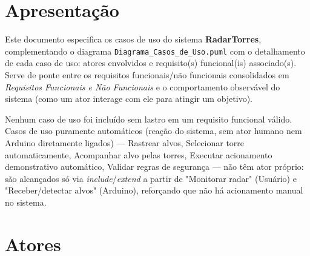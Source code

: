 %

\section{Apresentação}

Este documento especifica os casos de uso do sistema \textbf{RadarTorres}, complementando o
diagrama \texttt{Diagrama\_Casos\_de\_Uso.puml} com o detalhamento de cada caso de uso: atores
envolvidos e requisito(s) funcional(is) associado(s). Serve de ponte entre os requisitos
funcionais/não funcionais consolidados em \emph{Requisitos Funcionais e Não Funcionais} e o
comportamento observável do sistema (como um ator interage com ele para atingir um objetivo).

Nenhum caso de uso foi incluído sem lastro em um requisito funcional válido. Casos de uso
puramente automáticos (reação do sistema, sem ator humano nem Arduino diretamente ligados) —
Rastrear alvos, Selecionar torre automaticamente, Acompanhar alvo pelas torres, Executar
acionamento demonstrativo automático, Validar regras de segurança — não têm ator próprio: são
alcançados só via \emph{include}/\emph{extend} a partir de "Monitorar radar" (Usuário) e
"Receber/detectar alvos" (Arduino), reforçando que não há acionamento manual no sistema.

\section{Atores}

